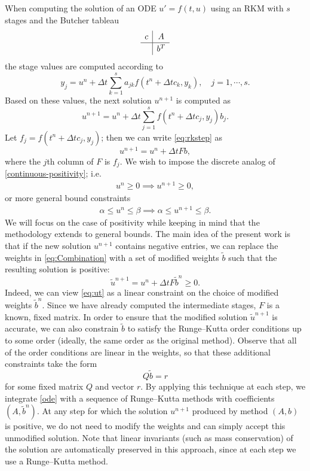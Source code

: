 \documentclass[a4paper]{article}
\numberwithin{equation}{section}
\theoremstyle{plain}
\theoremstyle{definition}
\numberwithin{theorem}{section}
\newcommand{\dt}{{\Delta t}}
\newcommand{\1}{\mathbbm{1}}
\newcommand{\ut}{\tilde{u}}
\newcommand{\bt}{\tilde{b}}
\begin{document}
When computing the solution of an ODE $u ' = f(t,u) $ using an RKM with $s$ stages and the Butcher tableau
\begin{align}
\renewcommand{\arraystretch}{1.2}
\begin{array}{c|c}
c &  A \\
\hline
 & b^T\\
\end{array}
\end{align}
the stage values are computed according to
\begin{equation}\label{eq:stagevalues}
y_j =  u^n + \dt \sum_{k = 1}^{s} a_{jk} f(t^n + \dt c_k,y_k),  \quad j = 1,\cdots,s.
\end{equation}
Based on these values, the next solution $u^{n+1}$ is computed as
\begin{equation} \label{eq:rkstep}
u^{n+1} = u^n + \dt \sum_{j  = 1}^s f(t^n + \dt c_j,y_j) b_j .
\end{equation}
Let $f_j = f(t^n + \dt c_j,y_j)$; then we can write \eqref{eq:rkstep} as
\begin{equation}\label{eq:Combination}
u^{n+1} = u^n + \dt F b,
\end{equation}
where the $j$th column of $F$ is $f_j$.
We wish to impose the discrete analog of \eqref{continuous-positivity}; i.e.\
\begin{align} \label{positivity}
    u^n\ge 0 \implies u^{n+1} \ge 0,
\end{align}
or more general bound constraints
\begin{align}
    \alpha \le u^n\le \beta \implies \alpha \le u^{n+1} \le \beta.
\end{align}
We will focus on the case of positivity while keeping in mind that
the methodology extends to general bounds.
The main idea of the present work is that if the new solution $u^{n+1}$ contains
negative entries, we can replace the weights in \eqref{eq:Combination} with
a set of modified weights $\bt$ such that the resulting solution is positive:
\begin{equation}\label{eq:ut}
\ut^{n+1} = u^n + \dt F \bt^n \ge 0.
\end{equation}
Indeed, we can view \eqref{eq:ut} as a linear constraint on the choice of
modified weights $\bt^n$.  Since we have already computed the intermediate stages,
$F$ is a known, fixed matrix.  In order to ensure that the modified solution $\ut^{n+1}$
is accurate, we can also constrain $\bt$ to satisfy the Runge--Kutta order conditions
up to some order (ideally, the same order as the original method).  Observe that
all of the order conditions are linear in the weights, so that these additional constraints
take the form
$$
Q\bt = r
$$
for some fixed matrix $Q$ and vector $r$.
By applying this technique at each step, we integrate \eqref{ode} with a
sequence of Runge--Kutta methods with coefficients $(A,\bt^n)$.  At any step
for which the solution $u^{n+1}$ produced by method $(A,b)$ is positive, we do not
need to modify the weights and can simply accept this unmodified solution.
Note that linear invariants (such as mass conservation) of the solution are
automatically preserved in this approach, since at each step we use a Runge--Kutta
method.
\end{document}
